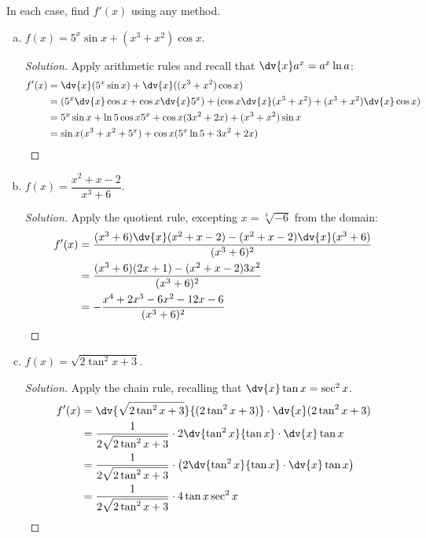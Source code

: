 \question In each case, find $f'(x)$ using any method.
\begin{enumerate}[(a)]
  \item $f(x)=5^x\sin x+(x^3+x^2)\cos x$.
        \begin{proof}[Solution]
          Apply arithmetic rules and recall that $\dv{x}a^x=a^x\ln a$:
          \begin{align*}
            f'(x) & = \dv{x}(5^x\sin x)+\dv{x}((x^3+x^2)\cos x)                                         \\
                  & = (5^x\dv{x}\cos x + \cos x\dv{x}5^x)+(\cos x\dv{x}(x^3+x^2)+(x^3+x^2)\dv{x}\cos x) \\
                  & = 5^x\sin x + \ln 5\cos x5^x + \cos x(3x^2+2x)+(x^3+x^2)\sin x                      \\
                  & = \sin x(x^3+x^2+5^x) + \cos x(5^x\ln 5 + 3x^2+2x) \qedhere
          \end{align*}
        \end{proof}
  \item $f(x)=\dfrac{x^2+x-2}{x^3+6}$.
        \begin{proof}[Solution]
          Apply the quotient rule, excepting $x=\sqrt[3]{-6}$ from the domain:
          \begin{align*}
            f'(x) & = \frac{(x^3+6)\dv{x}(x^2+x-2)-(x^2+x-2)\dv{x}(x^3+6)}{(x^3+6)^2} \\
                  & = \frac{(x^3+6)(2x+1)-(x^2+x-2)3x^2}{(x^3+6)^2}                   \\
                  & = -\frac{x^4+2x^3-6x^2-12x-6}{(x^3+6)^2} \qedhere
          \end{align*}
        \end{proof}
  \item $f(x)=\sqrt{2\tan^2x+3}$.
        \begin{proof}[Solution]
          Apply the chain rule, recalling that $\dv{x}\tan x=\sec^2 x$.
          \begin{align*}
            f'(x)
             & = \dv{\sqrt{2\tan^2x+3}}{(2\tan^2x+3)}\cdot \dv{x}(2\tan^2x+3)                              \\
             & = \frac{1}{2\sqrt{2\tan^2x+3}} \cdot 2\dv{\tan^2x}{\tan x} \cdot \dv{x}\tan x               \\
             & = \frac{1}{2\sqrt{2\tan^2x+3}} \cdot \left(2\dv{\tan^2x}{\tan x} \cdot \dv{x}\tan x \right) \\
             & = \frac{1}{2\sqrt{2\tan^2x+3}} \cdot 4\tan x \sec^2x                                        \\

\end{align*}
\end{proof}
\end{enumerate}
